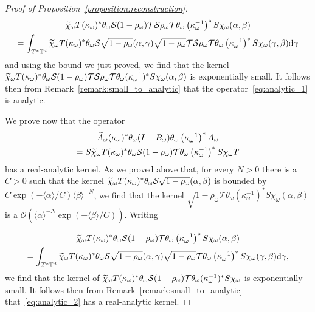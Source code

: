 \documentclass[AHL,Unicode,longabstracts,published]{cedram}
\newcommand{\brac}[1]{\langle #1 \rangle}
\newcommand{\clO}{\mathcal{O}}
\newcommand{\clT}{\mathcal{T}}
\newcommand{\clS}{\mathcal{S}}
\newcommand{\bbT}{\mathbb{T}}
\newcommand{\rmd}{\mathrm{d}}
\let\oldtilde\tilde
\renewcommand*{\tilde}[1]{\mathchoice{\widetilde{#1}}{\widetilde{#1}}{\oldtilde{#1}}{\oldtilde{#1}}}
\newcommand{\clO}{\mathcal{O}}
\begin{document}
\begin{proof}[Proof of Proposition~\ref{proposition:reconstruction}]
\begin{multline*}
\tilde{\chi}_\omega T (\kappa_\omega)^*\theta_\omega \clS (1 - \rho_\omega) \clT \clS \rho_\omega \clT \theta_\omega \left(\kappa_\omega^{-1}\right)^* S \chi_\omega(\alpha,\beta) \\
= \int_{T^* \bbT^d} \tilde{\chi}_\omega T (\kappa_\omega)^*\theta_\omega \clS \sqrt{1 - \rho_\omega}(\alpha,\gamma) \sqrt{1 - \rho_\omega}\clT \clS \rho_\omega \clT \theta_\omega \left(\kappa_\omega^{-1}\right)^* S \chi_\omega(\gamma,\beta) \rmd \gamma
\end{multline*}
and using the bound we just proved, we find that the kernel $\tilde{\chi}_\omega T (\kappa_\omega)^*\theta_\omega \clS (1 - \rho_\omega) \clT \clS \rho_\omega \clT \theta_\omega (\kappa_\omega^{-1})^* S \chi_\omega(\alpha,\beta)$ is exponentially small. It follows then from Remark~\ref{remark:small_to_analytic} that the operator~\eqref{eq:analytic_1} is analytic.

We prove now that the operator
\begin{multline}\label{eq:analytic_2}
\widetilde{A}_\omega (\kappa_\omega)^* \theta_\omega (I - B_\omega) \theta_\omega \left(\kappa_\omega^{-1}\right)^* A_\omega \\
 = S \tilde{\chi}_\omega T (\kappa_\omega)^*\theta_\omega \clS (1 - \rho_\omega) \clT \theta_\omega \left(\kappa_\omega^{-1}\right)^* S \chi_\omega T
\end{multline}
has a real-analytic kernel. As we proved above that, for every $N > 0$ there is a $C > 0$ such that the kernel $\tilde{\chi}_\omega T (\kappa_\omega)^*\theta_\omega \clS \sqrt{1 - \rho_\omega}(\alpha,\beta)$ is bounded by $C\exp(- \brac{\alpha}/C) \brac{\beta}^{-N}$, we find that the kernel $\sqrt{1 - \rho_\omega} \clT \theta_\omega (\kappa_\omega^{-1})^* S \chi_\omega(\alpha,\beta)$ is a $\clO(\brac{\alpha}^{-N} \exp(- \brac{\beta}/C))$. Writing

\begin{multline*}
\tilde{\chi}_\omega T (\kappa_\omega)^*\theta_\omega \clS (1 - \rho_\omega) \clT \theta_\omega \left(\kappa_\omega^{-1}\right)^* S \chi_\omega(\alpha,\beta)\\ = \int_{T^* \bbT^d} \tilde{\chi}_\omega T (\kappa_\omega)^*\theta_\omega \clS \sqrt{1 - \rho_\omega}(\alpha,\gamma)\sqrt{1 - \rho_\omega} \clT \theta_\omega \left(\kappa_\omega^{-1}\right)^* S \chi_\omega(\gamma,\beta) \rmd \gamma,
\end{multline*}
we find that the kernel of $\tilde{\chi}_\omega T (\kappa_\omega)^*\theta_\omega \clS (1 - \rho_\omega) \clT \theta_\omega (\kappa_\omega^{-1})^* S \chi_\omega$ is exponentially small. It follows then from Remark~\ref{remark:small_to_analytic} that~\eqref{eq:analytic_2} has a real-analytic kernel.


\end{proof}
\end{document}
